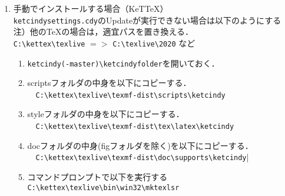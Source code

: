 \documentclass{ujarticle}
\begin{document}
\begin{enumerate}[\bf\large 1.]
\item 手動でインストールする場合（KeTTeX）\vspace{2mm}\\
 \verb|ketcindysettings.cdy|のUpdateが実行できない場合は以下のようにする\\
 \hspace*{1zw}注）他のTeXの場合は，適宜パスを置き換える．\\
 \hspace*{4zw}\verb|C:\kettex\texlive| $=>$ \verb|C:\texlive\2020| など
\begin{enumerate}[(1)]
  \item \verb|ketcindy(-master)\ketcindyfolder|を開いておく．
  \item scriptsフォルダの中身を以下にコピーする．\\
　\verb|C:\kettex\texlive\texmf-dist\scripts\ketcindy|
  \item styleフォルダの中身を以下にコピーする．\\
　\verb|C:\kettex\texlive\texmf-dist\tex\latex\ketcindy|
  \item docフォルダの中身(figフォルダを除く)を以下にコピーする．\\
　\verb|C:\kettex\texlive\texmf-dist\doc\supports\ketcindy||
  \item コマンドプロンプトで以下を実行する\\
  \hspace*{1zw}\verb|C:\kettex\texlive\bin\win32\mktexlsr|
  \end{enumerate}
\end{enumerate}
\end{document}
